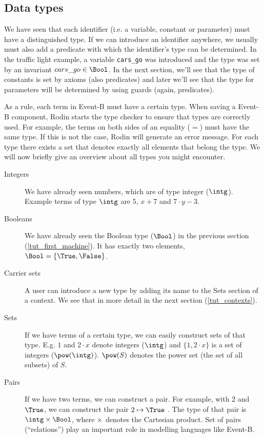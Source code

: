 \subsection{Data types}
\label{tut_data_types}
We have seen that each identifier (i.e. a variable, constant or parameter) must have a distinguished type.
If we can introduce an identifier anywhere, we usually must also add a predicate with which the
identifier's type can be determined. In the traffic light example, a variable \texttt{cars\_go} was
introduced and the type was set by an invariant $cars\_go \in \Bool$. In the next section, we'll see that the type of constants is set by axioms (also predicates) and later we'll see that the type for parameters will be determined by using guards (again, predicates).

As a rule, each term in Event-B must have a certain type. 
When saving a Event-B component, Rodin starts the type checker to ensure that types are correctly used. For example, the terms on both sides of an equality ($=$) must have the same type. If this is not the case, Rodin will generate an error message.
For each type there exists a set that denotes exactly all elements that belong the type. We will now briefly
give an overview about all types you might encounter.

\begin{description}
\item[Integers] 
  We have already seen numbers, which are of type integer ($\intg$).
  Example terms of type $\intg$ are $5$, $x+7$ and $7 \cdot y - 3$.
\item[Booleans]
  We have already seen the Boolean type ($\Bool$) in the previous section (\ref{tut_first_machine}).
  It has exactly two elements, $\Bool = \{\True,\False\}$.
\item[Carrier sets]
  A user can introduce a new type by adding its name to the
  \textsf{Sets} section of a context. We see that in more detail in the next section (\ref{tut_contexts}).
\item[Sets]
  If we have terms of a certain type, we can easily construct sets of that type.
  E.g. $1$ and $2\cdot x$ denote integers ($\intg$) and $\{1,2\cdot x\}$ is a set of integers ($\pow(\intg)$).
  $\pow(S)$  denotes the power set (the set of all subsets) of $S$.
\item[Pairs]
  If we have two terms, we can construct a pair. For example, with $2$ and $\True$, we
  can construct the pair $2\mapsto\True$ .
  The type of that pair is $\intg\cprod\Bool$, where $\mathbin\times$ denotes the Cartesian product.
  Set of pairs (``relations'') play an important role in modelling languages like Event-B.
\end{description}

